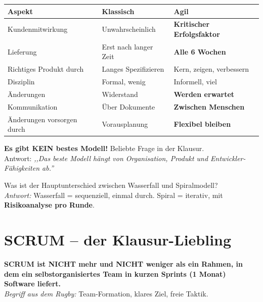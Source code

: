 \documentclass[11pt,a4paper]{article}
\renewcommand{\arraystretch}{1.25}
\begin{document}
\begin{center}
\renewcommand{\arraystretch}{1.4}
\begin{tabularx}{\linewidth}{lXX}
\toprule
\textbf{Aspekt} & \textbf{Klassisch} & \textbf{Agil}\\
\midrule
Kundenmitwirkung & Unwahrscheinlich & \textbf{Kritischer Erfolgsfaktor}\\
Lieferung & Erst nach langer Zeit & \textbf{Alle 6 Wochen}\\
Richtiges Produkt durch & Langes Spezifizieren & Kern, zeigen, verbessern\\
Disziplin & Formal, wenig & Informell, viel\\
Änderungen & Widerstand & \textbf{Werden erwartet}\\
Kommunikation & Über Dokumente & \textbf{Zwischen Menschen}\\
Änderungen vorsorgen durch & Vorausplanung & \textbf{Flexibel bleiben}\\
\bottomrule
\end{tabularx}
\end{center}

\begin{trap}
\textbf{Es gibt KEIN bestes Modell!} Beliebte Frage in der Klausur.\\
Antwort: \emph{,,Das beste Modell hängt von Organisation, Produkt und Entwickler-Fähigkeiten ab.''}
\end{trap}

\begin{quickcheck}
Was ist der Hauptunterschied zwischen Wasserfall und Spiralmodell?\\
\emph{Antwort:} Wasserfall = sequenziell, einmal durch. Spiral = iterativ, mit \textbf{Risikoanalyse pro Runde}.
\end{quickcheck}

\newpage
\section{SCRUM -- der Klausur-Liebling}

\begin{tldr}
\textbf{SCRUM ist NICHT mehr und NICHT weniger als ein Rahmen, in dem ein selbstorganisiertes Team in kurzen Sprints (1 Monat) Software liefert.}\\
\emph{Begriff aus dem Rugby:} Team-Formation, klares Ziel, freie Taktik.
\end{tldr}
\end{document}
